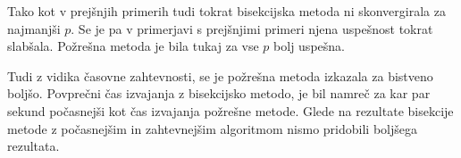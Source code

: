 \documentclass[a4paper]{article}
\begin{document}
Tako kot v prejšnjih primerih tudi tokrat bisekcijska metoda ni skonvergirala za najmanjši $p$. Se je pa v primerjavi s prejšnjimi primeri njena uspešnost tokrat slabšala. Požrešna metoda je bila tukaj za vse $p$ bolj uspešna.

Tudi z vidika časovne zahtevnosti, se je požrešna metoda izkazala za bistveno boljšo. Povprečni čas izvajanja z bisekcijsko metodo, je bil namreč za kar par sekund počasnejši kot čas izvajanja požrešne metode. Glede na rezultate bisekcije metode z počasnejšim in zahtevnejšim algoritmom nismo pridobili boljšega rezultata. 
\end{document}
